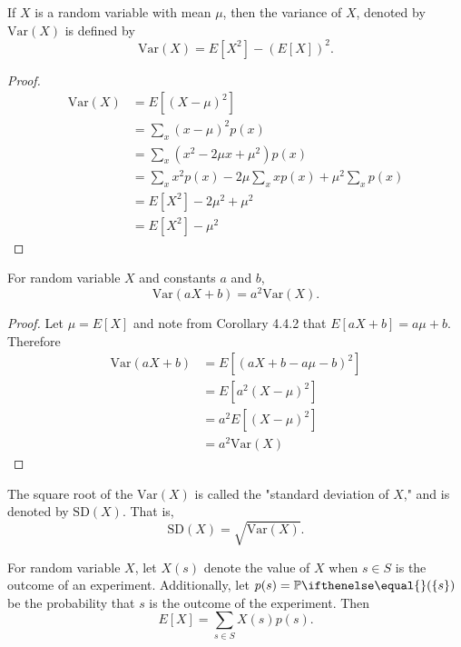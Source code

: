 \documentclass[a4paper,8pt]{article}
\begin{document}
\begin{outline}
    If \(X\) is a random variable with mean \(\mu\), then the variance of \(X\), denoted by \(\text{Var}(X)\)
    is defined by \[\text{Var}(X) = E[X^2]-(E[X])^2\text{.} \]

    \begin{proof}
      \begin{align*}
        \text{Var}(X) &= E[(X-\mu)^2] \\
                      &= \sum_x(x-\mu)^2p(x) \\
                      &= \sum_x(x^2-2\mu x+\mu^2)p(x) \\
                      &= \sum_x x^2p(x) - 2\mu\sum_x xp(x) + \mu^2\sum_x p(x) \\
                      &= E[X^2] - 2\mu^2 + \mu^2 \\
                      &= E[X^2] - \mu^2
      \end{align*}
    \end{proof}

    For random variable \(X\) and constants \(a\) and \(b\),
    \[ \text{Var}(aX+b) = a^2\text{Var}(X)\text{.} \]

    \begin{proof}
      Let \(\mu = E[X]\) and note from Corollary 4.4.2 that \(E[aX+b] = a\mu+b\).
      Therefore
      \begin{align*}
        \text{Var}(aX+b) &= E[(aX+b-a\mu-b)^2] \\
                         &= E[a^2(X-\mu)^2] \\
                         &= a^2E[(X-\mu)^2] \\
                         &= a^2\text{Var}(X)
      \end{align*}
    \end{proof}

    The square root of the \(\text{Var}(X)\) is called the "standard deviation of \(X\)," and is denoted by
    \(\text{SD}(X)\). That is, \[\text{SD}(X) = \sqrt{\text{Var}(X)}\text{.}\]

    For random variable \(X\), let \(X(s)\) denote the value of \(X\) when \(s \in S\) is the outcome of an experiment.
    Additionally, let \(p(s) = \bbp(\{s\})\) be the probability that \(s\) is the outcome of the experiment. Then
    \[ E[X] = \sum_{s\in S} X(s)p(s)\text{.} \]


\end{outline}
\end{document}
